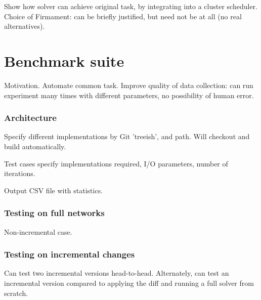 Show how solver can achieve original task, by integrating into a cluster scheduler. Choice of Firmament: can be briefly justified, but need not be at all (no real alternatives).

\section{Benchmark suite} \label{sec:impl-benchmark}


Motivation. Automate common task. Improve quality of data collection: can run experiment many times with different parameters, no possibility of human error. 

\subsubsection{Architecture}

Specify different implementations by Git 'treeish', and path. Will checkout and build automatically. 

Test cases specify implementations required, I/O parameters, number of iterations.

Output CSV file with statistics.

\subsubsection{Testing on full networks}

Non-incremental case.

\subsubsection{Testing on incremental changes}

Can test two incremental versions head-to-head. Alternately, can test an incremental version compared to applying the diff and running a full solver from scratch.